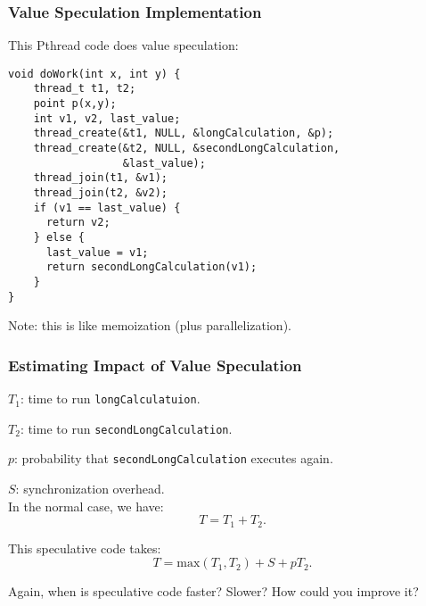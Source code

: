 \begin{frame}[fragile]
  \frametitle{Value Speculation Implementation}

  
  This Pthread code does value speculation:
  
  \begin{lstlisting}
void doWork(int x, int y) {
    thread_t t1, t2;
    point p(x,y);
    int v1, v2, last_value;
    thread_create(&t1, NULL, &longCalculation, &p);
    thread_create(&t2, NULL, &secondLongCalculation,
                  &last_value);
    thread_join(t1, &v1);
    thread_join(t2, &v2);
    if (v1 == last_value) {
      return v2;
    } else {
      last_value = v1;
      return secondLongCalculation(v1);
    }
}
  \end{lstlisting}

  Note: this is like memoization (plus parallelization).
  
\end{frame}

\begin{frame}
  \frametitle{Estimating Impact of Value Speculation}

  
  $T_1$: time to run {\tt longCalculatuion}.

  $T_2$: time to run {\tt secondLongCalculation}.

  $p$: probability that {\tt secondLongCalculation} executes again.

  $S$: synchronization overhead.\\[1em]

  In the normal case, we have:
    \[ T = T_1 +T_2.\]

  This speculative code takes:
    \[ T = \mbox{max}(T_1, T_2) + S + pT_2.\]

     Again, when is speculative code faster? Slower? How could you improve it?

  
\end{frame}

